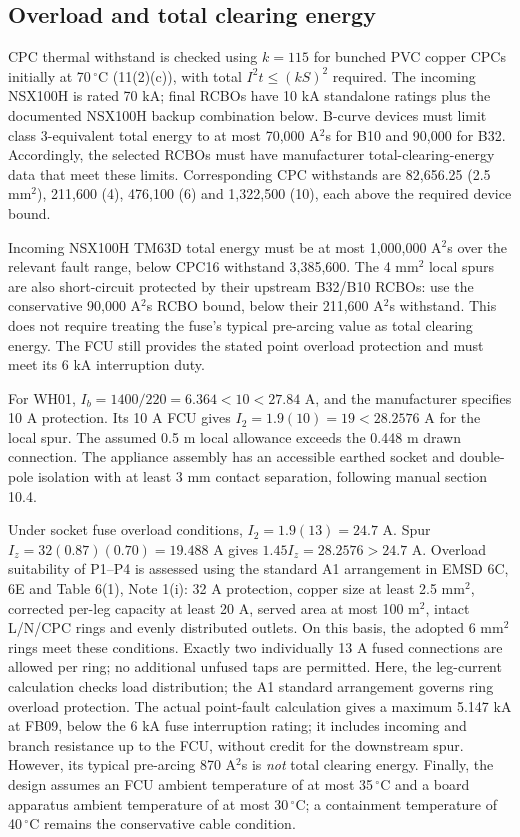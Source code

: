 \subsection*{Overload and total clearing energy}
CPC thermal withstand is checked using $k=115$ for bunched PVC copper CPCs initially at 70\,$^\circ$C (11(2)(c)), with total $I^2t\le(kS)^2$ required. The incoming NSX100H is rated 70 kA; final RCBOs have 10 kA standalone ratings plus the documented NSX100H backup combination below. B-curve devices must limit class 3-equivalent total energy to at most 70,000 A$^2$s for B10 and 90,000 for B32. Accordingly, the selected RCBOs must have manufacturer total-clearing-energy data that meet these limits. Corresponding CPC withstands are 82,656.25 (2.5 mm$^2$), 211,600 (4), 476,100 (6) and 1,322,500 (10), each above the required device bound.

Incoming NSX100H TM63D total energy must be at most 1,000,000 A$^2$s over the relevant fault range, below CPC16 withstand 3,385,600. The 4 mm$^2$ local spurs are also short-circuit protected by their upstream B32/B10 RCBOs: use the conservative 90,000 A$^2$s RCBO bound, below their 211,600 A$^2$s withstand. This does not require treating the fuse's typical pre-arcing value as total clearing energy. The FCU still provides the stated point overload protection and must meet its 6 kA interruption duty.

For WH01, $I_b=1400/220=6.364<10<27.84$ A, and the manufacturer specifies 10 A protection. Its 10 A FCU gives $I_2=1.9(10)=19<28.2576$ A for the local spur. The assumed 0.5 m local allowance exceeds the 0.448 m drawn connection. The appliance assembly has an accessible earthed socket and double-pole isolation with at least 3 mm contact separation, following manual section 10.4.

Under socket fuse overload conditions, $I_2=1.9(13)=24.7$ A. Spur $I_z=32(0.87)(0.70)=19.488$ A gives $1.45I_z=28.2576>24.7$ A. Overload suitability of P1--P4 is assessed using the standard A1 arrangement in EMSD 6C, 6E and Table 6(1), Note 1(i): 32 A protection, copper size at least 2.5 mm$^2$, corrected per-leg capacity at least 20 A, served area at most 100 m$^2$, intact L/N/CPC rings and evenly distributed outlets. On this basis, the adopted 6 mm$^2$ rings meet these conditions. Exactly two individually 13 A fused connections are allowed per ring; no additional unfused taps are permitted. Here, the leg-current calculation checks load distribution; the A1 standard arrangement governs ring overload protection. The actual point-fault calculation gives a maximum 5.147 kA at FB09, below the 6 kA fuse interruption rating; it includes incoming and branch resistance up to the FCU, without credit for the downstream spur. However, its typical pre-arcing 870 A$^2$s is \emph{not} total clearing energy. Finally, the design assumes an FCU ambient temperature of at most 35\,$^\circ$C and a board apparatus ambient temperature of at most 30\,$^\circ$C; a containment temperature of 40\,$^\circ$C remains the conservative cable condition.

